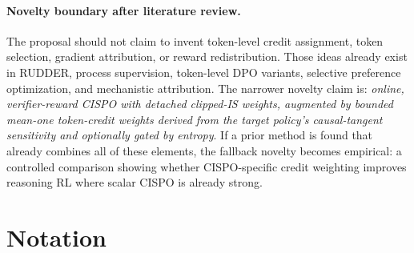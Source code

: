\documentclass[11pt]{article}
\begin{document}
\paragraph{Novelty boundary after literature review.}
The proposal should not claim to invent token-level credit assignment, token
selection, gradient attribution, or reward redistribution. Those ideas already
exist in RUDDER, process supervision, token-level DPO variants, selective
preference optimization, and mechanistic attribution. The narrower novelty
claim is: \emph{online, verifier-reward CISPO with detached clipped-IS weights,
augmented by bounded mean-one token-credit weights derived from the target
policy's causal-tangent sensitivity and optionally gated by entropy}. If a
prior method is found that already combines all of these elements, the fallback
novelty becomes empirical: a controlled comparison showing whether
CISPO-specific credit weighting improves reasoning RL where scalar CISPO is
already strong.

\section{Notation}
\end{document}

